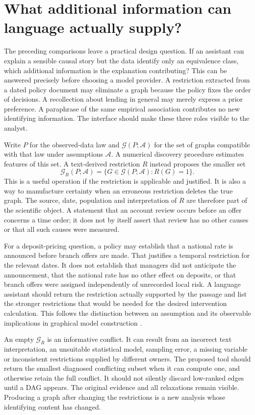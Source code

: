 \section{What additional information can language actually supply?}
\label{exec14:l4-development}

The preceding comparisons leave a practical design question. If an assistant
can explain a sensible causal story but the data identify only an equivalence
class, which additional information is the explanation contributing? This can
be answered precisely before choosing a model provider. A restriction extracted
from a dated policy document may eliminate a graph because the policy fixes the
order of decisions. A recollection about lending in general may merely express
a prior preference. A paraphrase of the same empirical association contributes
no new identifying information. The interface should make these three roles
visible to the analyst.

Write $P$ for the observed-data law and $\mathcal G(P;\mathcal A)$ for the set
of graphs compatible with that law under assumptions $\mathcal A$. A numerical
discovery procedure estimates features of this set. A text-derived restriction
$R$ instead proposes the smaller set
\[
 \mathcal G_R(P;\mathcal A)=\{G\in\mathcal G(P;\mathcal A):R(G)=1\}.
\]
This is a useful operation if the restriction is applicable and justified. It
is also a way to manufacture certainty when an erroneous restriction deletes
the true graph. The source, date, population and interpretation of $R$ are
therefore part of the scientific object. A statement that an account review
occurs before an offer concerns a time order; it does not by itself assert that
review has no other causes or that all such causes were measured.

For a deposit-pricing question, a policy may establish that a national rate is
announced before branch offers are made. That justifies a temporal restriction
for the relevant dates. It does not establish that managers did not anticipate
the announcement, that the national rate has no other effect on deposits, or
that branch offers were assigned independently of unrecorded local risk. A
language assistant should return the restriction actually supported by the
passage and list the stronger restrictions that would be needed for the desired
intervention calculation. This follows the distinction between an assumption
and its observable implications in graphical model construction
\citep{exec13_census_credible}.

An empty $\mathcal G_R$ is an informative conflict. It can result from an
incorrect text interpretation, an unsuitable statistical model, sampling error,
a missing variable or inconsistent restrictions supplied by different owners.
The proposed tool should return the smallest diagnosed conflicting subset when
it can compute one, and otherwise retain the full conflict. It should not
silently discard low-ranked edges until a DAG appears. The original evidence
and all relaxations remain visible. Producing a graph after changing the
restrictions is a new analysis whose identifying content has changed.

